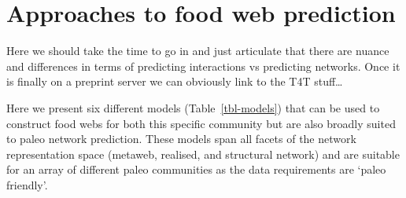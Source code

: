 \documentclass[
]{article}
\begin{document}
\section{Approaches to food web
prediction}\label{approaches-to-food-web-prediction}

Here we should take the time to go in and just articulate that there are
nuance and differences in terms of predicting interactions vs predicting
networks. Once it is finally on a preprint server we can obviously link
to the T4T stuff\ldots{}

Here we present six different models (Table~\ref{tbl-models}) that can
be used to construct food webs for both this specific community but are
also broadly suited to paleo network prediction. These models span all
facets of the network representation space (metaweb, realised, and
structural network) and are suitable for an array of different paleo
communities as the data requirements are `paleo friendly'.
\end{document}
